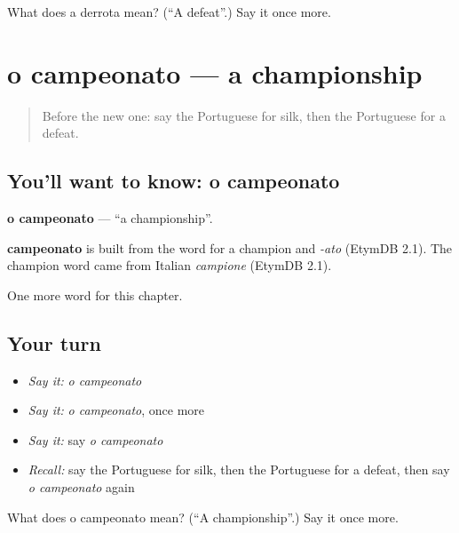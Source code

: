 \begin{tcolorbox}[breakable,colback=teal!4,colframe=teal!35!black,title={Before you move on}]
What does a derrota mean? (\textquotedblleft{}A defeat\textquotedblright{}.) Say it once more.
\end{tcolorbox}
\section[o campeonato]{o campeonato — a championship}

\label{lesson:PT-C252-campeonato}



\begin{quote}
Before the new one: say the Portuguese for silk, then the Portuguese for a defeat.
\end{quote}

\subsection*{You'll want to know: o campeonato}
\textbf{o campeonato} — \textquotedblleft{}a championship\textquotedblright{}.

\begin{cousinweb}
\textbf{campeonato} is built from the word for a champion and \emph{-ato} (EtymDB 2.1). The champion word came from Italian \emph{campione} (EtymDB 2.1).
\end{cousinweb}

\begin{grammarlens}[title={What you've built}]
One more word for this chapter.
\end{grammarlens}

\subsection*{Your turn}
\begin{itemize}
\raggedright
  \item \emph{Say it:} \emph{o campeonato}
  \item \emph{Say it:} \emph{o campeonato}, once more
  \item \emph{Say it:} say \emph{o campeonato}
  \item \emph{Recall:} say the Portuguese for silk, then the Portuguese for a defeat, then say \emph{o campeonato} again
\end{itemize}

\begin{tcolorbox}[breakable,colback=teal!4,colframe=teal!35!black,title={Before you move on}]
What does o campeonato mean? (\textquotedblleft{}A championship\textquotedblright{}.) Say it once more.
\end{tcolorbox}
